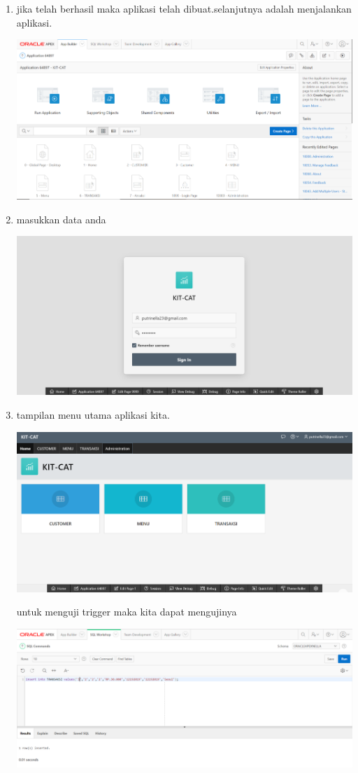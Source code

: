 \documentclass[a4paper, 12pt]{article}
\begin{document}
\begin{enumerate}
\begin{center}
\end{center}
\item jika telah berhasil maka aplikasi telah dibuat.selanjutnya adalah menjalankan aplikasi.
\begin{center}
    \includegraphics[width=.8\textwidth]{figure/9.PNG}
\end{center}
\item masukkan data anda
\begin{center}
    \includegraphics[width=.8\textwidth]{figure/10.PNG}
\end{center}
\item tampilan menu utama aplikasi kita.
\begin{center}
    \includegraphics[width=.8\textwidth]{figure/11.PNG}
\end{center}
untuk menguji trigger maka kita dapat mengujinya
\begin{center}
    \includegraphics[width=.8\textwidth]{figure/12.PNG}

\end{center}
\end{enumerate}
\end{document}

